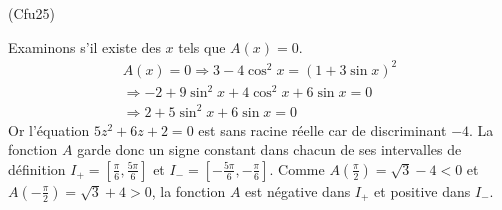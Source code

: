 \begin{tiny}(Cfu25)\end{tiny} Examinons s'il existe des $x$ tels que $A(x)=0$.
\begin{multline*}
A(x)=0 \Rightarrow 3-4\cos^2 x = (1+3\sin x)^2\\
\Rightarrow -2+9\sin^2 x + 4\cos^2x+6\sin  x = 0\\
\Rightarrow 2+5\sin^2x + 6\sin x =0
\end{multline*}
Or l'équation $5z^2 +6z +2=0$ est sans racine réelle car de discriminant $-4$.\newline
La fonction $A$ garde donc un signe constant dans chacun de ses intervalles de définition $I_+=[\frac{\pi}{6},\frac{5\pi}{6}]$ et 
$I_-=[-\frac{5\pi}{6}, -\frac{\pi}{6}]$.\newline
Comme $A(\frac{\pi}{2})=\sqrt{3} -4<0$ et $A(-\frac{\pi}{2})=\sqrt{3} +4>0$, la fonction $A$ est négative dans $I_+$ et positive dans $I_-$.